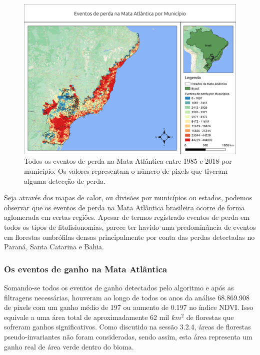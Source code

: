 \begin{figure}[H]
    \centering
    \includegraphics[scale=.5]{images/mun_loss_mun_masked85_maskedgain.png}
    \caption{Todos os eventos de perda na Mata Atlântica entre 1985 e 2018 por município. Os valores representam o número de pixels que tiveram alguma detecção de perda.}
    \label{fig:mun_loss_masked85_maskedgain}
\end{figure}

Seja através dos mapas de calor, ou divisões por municípios ou estados, podemos observar que os eventos de perda na Mata Atlântica brasileira ocorre de forma aglomerada em certas regiões. Apesar de termos registrado eventos de perda em todos os tipos de fitofisionomias, parece ter havido uma predominância de eventos em florestas ombrófilas densas principalmente por conta das perdas detectadas no Paraná, Santa Catarina e Bahia.

\subsubsection{Os eventos de ganho na Mata Atlântica}

\hspace{13pt} Somando-se todos os eventos de ganho detectados pelo algoritmo e após as filtragens necessárias, houveram ao longo de todos os anos da análise 68.869.908 de pixels com um ganho médio de 197 ou aumento de 0.197 no índice NDVI. Isso equivale a uma área total de aproximadamente 62 mil $ km^2 $ de florestas que sofreram ganhos significativos. Como discutido na sessão 3.2.4, áreas de florestas pseudo-invariantes não foram consideradas, sendo assim, esta área representa um ganho real de área verde dentro do bioma. 

